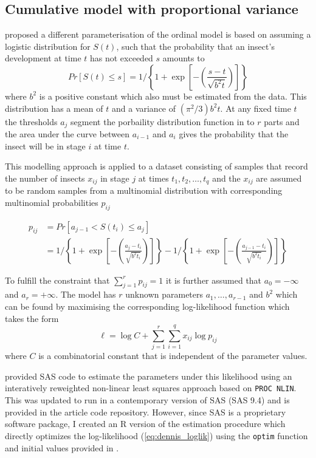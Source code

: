 \subsection{Cumulative model with proportional variance}
\citet{dennis1986stochastic} proposed a different parameterisation of the ordinal model is based on assuming a logistic distribution for $S(t)$, such that the probability that an insect's development at time $t$ has not exceeded $s$ amounts to 
\begin{equation}
Pr[S(t) \leq s] = 1 \bigg/ \left\{ 1 + \exp\left[-\left(\frac{s-t}{\sqrt{b^2t}}\right)\right]\right\}
\end{equation}
where $b^2$ is a positive constant which also must be estimated from the data. This distribution has a mean of $t$ and a variance of $(\pi^2/3)b^2t$.
At any fixed time $t$ the thresholds $a_j$ segment the porbaility distribution function in to $r$ parts and the area under the curve between $a_{i-1}$ and $a_i$ gives the probability that the insect will be in stage $i$ at time $t$.

This modelling approach is applied to a dataset consisting of samples that record the number of insects $x_{ij}$ in stage $j$ at times $t_1, t_2, \dots, t_q$ and the $x_{ij}$ are assumed to be random samples from a multinomial distribution with corresponding multinomial probabilities $p_{ij}$

\begin{align}
p_{ij} & = Pr[a_{j-1} < S(t_i) \leq a_{j}]\\
& = 1 \bigg/ \left\{ 1 + \exp\left[-\left(\frac{a_j-t_i}{\sqrt{b^2t_i}}\right)\right]\right\} - 1 \bigg/ \left\{ 1 + \exp\left[-\left(\frac{a_{j-1}-t_i}{\sqrt{b^2t_i}}\right)\right]\right\}\label{eq:dennis_cm}
\end{align}

To fulfill the constraint that $\sum_{j=1}^r p_{ij}= 1$ it is further assumed that $a_0 = -\infty$ and $a_r = +\infty$.
The model has $r$ unknown parameters $a_1, \dots, a_{r-1}$ and $b^2$ which can be found by maximising the corresponding log-likelihood function which takes the form 
\begin{equation}
\mathcal{\ell} = \log C + \sum_{j=1}^r \sum_{i=1}^q x_{ij} \log p_{ij}
\label{eq:dennis_loglik}
\end{equation}
where $C$ is a combinatorial constant that is independent of the parameter values.

\citet{dennis1986stochastic} provided SAS code to estimate the parameters under this likelihood using an interatively reweighted non-linear least squares approach based on \verb+PROC NLIN+. This was updated to run in a contemporary version of SAS (SAS 9.4) and is provided in the article code repository. However, since SAS is a proprietary software package, I created an R version of the estimation procedure which directly optimizes the log-likelihood (\ref{eq:dennis_loglik}) using the \verb+optim+ function and initial values provided in \citep{dennis1986stochastic}.

